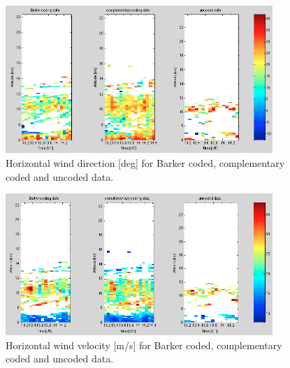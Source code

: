 \documentclass{article}
\begin{document}
\begin{figure}[htb]
\centering
\includegraphics[width=0.9\textwidth]{Figures/direction.png}
\caption{Horizontal wind direction [deg] for Barker coded, complementary coded and uncoded data.}
\label{fig:direction}
\end{figure}

\begin{figure}[htb]
\centering
\includegraphics[width=0.9\textwidth]{Figures/velocity.png}
\caption{Horizontal wind velocity [m/s] for Barker coded, complementary coded and uncoded data.}
\label{fig:direction}
\end{figure}

\end{document}
